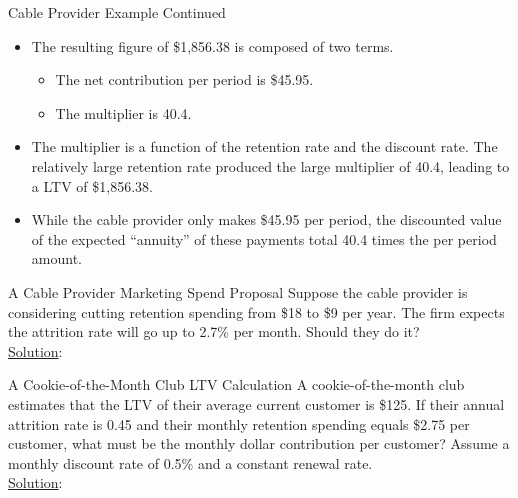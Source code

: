 \documentclass[pdf]{beamer}
\theoremstyle{remark}
\theoremstyle{definition}
\begin{document}
\begin{frame}[t]{Cable Provider Example Continued}
\begin{itemize}
\item The resulting figure of  \$1,856.38 is composed of two terms.
\begin{itemize}
  \item The net contribution per period is \$45.95.
  \item The multiplier is 40.4.
\end{itemize}
\item The multiplier is a function of the retention rate and the discount rate. The relatively large retention rate produced the large multiplier of 40.4, leading to a LTV of \$1,856.38.
\item While the cable provider only makes \$45.95 per period, the discounted value of the expected ``annuity'' of these payments total 40.4 times the per period amount.
\end{itemize}
\end{frame}

\begin{frame}[t]{A Cable Provider Marketing Spend Proposal}
Suppose the cable provider is considering cutting retention spending from \$18 to \$9 per year.  The firm expects the attrition rate will go up to 2.7\% per month. Should they do it? \\
\vspace{1.5ex}
\underline{Solution}:\\
\vspace{1.5ex}
 \end{frame}

\begin{frame}[t]{A Cookie-of-the-Month Club LTV Calculation}
A cookie-of-the-month club estimates that the LTV of their average current customer is \$125. If their annual attrition rate is 0.45 and their monthly retention spending equals \$2.75 per customer, what must be the monthly dollar contribution per customer? Assume a monthly discount rate of 0.5\% and a constant renewal rate. \\
\vspace{1.5ex}
\underline{Solution}:\\
\end{frame}
\end{document}
